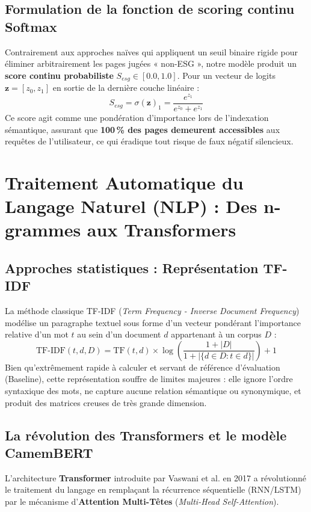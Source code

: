 \documentclass[12pt,a4paper]{report}
\begin{document}
\subsection{Formulation de la fonction de scoring continu Softmax}
Contrairement aux approches naïves qui appliquent un seuil binaire rigide pour éliminer arbitrairement les pages jugées « non-ESG », notre modèle produit un \textbf{score continu probabiliste} $S_{esg} \in [0.0, 1.0]$. Pour un vecteur de logits $\mathbf{z} = [z_0, z_1]$ en sortie de la dernière couche linéaire :
\begin{equation}
    S_{esg} = \sigma(\mathbf{z})_1 = \frac{e^{z_1}}{e^{z_0} + e^{z_1}}
\end{equation}
Ce score agit comme une pondération d'importance lors de l'indexation sémantique, assurant que \textbf{100\,\% des pages demeurent accessibles} aux requêtes de l'utilisateur, ce qui éradique tout risque de faux négatif silencieux.

\section{Traitement Automatique du Langage Naturel (NLP) : Des n-grammes aux Transformers}

\subsection{Approches statistiques : Représentation TF-IDF}
La méthode classique TF-IDF (\textit{Term Frequency - Inverse Document Frequency}) modélise un paragraphe textuel sous forme d'un vecteur pondérant l'importance relative d'un mot $t$ au sein d'un document $d$ appartenant à un corpus $D$ :
\begin{equation}
    \text{TF-IDF}(t, d, D) = \text{TF}(t, d) \times \log\left(\frac{1 + |D|}{1 + |\{d \in D : t \in d\}|}\right) + 1
\end{equation}
Bien qu'extrêmement rapide à calculer et servant de référence d'évaluation (Baseline), cette représentation souffre de limites majeures : elle ignore l'ordre syntaxique des mots, ne capture aucune relation sémantique ou synonymique, et produit des matrices creuses de très grande dimension.

\subsection{La révolution des Transformers et le modèle CamemBERT}
L'architecture \textbf{Transformer} introduite par Vaswani et al. en 2017 a révolutionné le traitement du langage en remplaçant la récurrence séquentielle (RNN/LSTM) par le mécanisme d'\textbf{Attention Multi-Têtes} (\textit{Multi-Head Self-Attention}).\\
\end{document}
